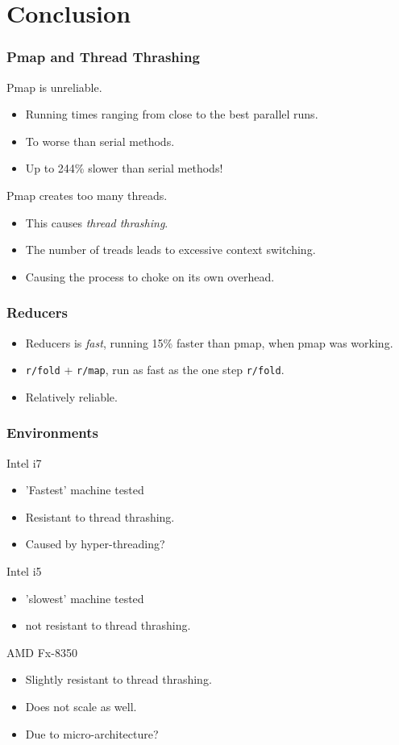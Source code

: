 \documentclass{beamer}
\newcommand{\clocode}[1]{{\texttt {#1}}}
\begin{document}
\section{Conclusion}
\begin{frame}
\frametitle{Pmap and Thread Thrashing}
	Pmap is unreliable.
	\begin{itemize}
	\item Running times ranging from close to the best parallel runs.
	\item To worse than serial methods.
	\item Up to 244\% slower than serial methods!
	\end{itemize}
Pmap creates too many threads.
	\begin{itemize}
	\item This causes \emph{thread thrashing}.
	\item The number of treads leads to excessive context switching.
	\item Causing the process to choke on its own overhead.
	\end{itemize}
\end{frame}
\begin{frame}
\frametitle{Reducers}
	\begin{itemize}
	\item Reducers is \emph{fast}, running 15\% faster than pmap, when pmap was working.
	\item \clocode{r/fold} + \clocode{r/map}, run as fast as the one step \clocode{r/fold}.
	\item Relatively reliable.
	\end{itemize}
\end{frame}
\begin{frame}
\frametitle{Environments}
Intel i7 
	\begin{itemize}
	\item 'Fastest' machine tested
	\item Resistant to thread thrashing.
	\item Caused by hyper-threading?
	\end{itemize}
Intel i5
	\begin{itemize}
	\item 'slowest' machine tested
	\item not resistant to thread thrashing.
	\end{itemize}
AMD Fx-8350
	\begin{itemize}
	\item Slightly resistant to thread thrashing.
	\item Does not scale as well.
	\item Due to micro-architecture?
	\end{itemize}
	
\end{frame}
\end{document}
